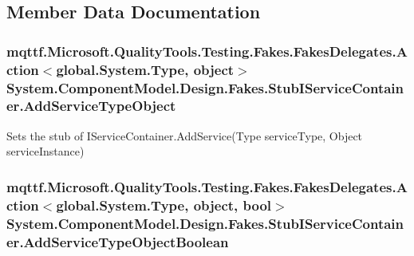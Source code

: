 \subsection{Member Data Documentation}
\hypertarget{class_system_1_1_component_model_1_1_design_1_1_fakes_1_1_stub_i_service_container_a14caf2877563b04dfa336bdf35048f4e}{
\subsubsection[{Add\-Service\-Type\-Object}]{\setlength{\rightskip}{0pt plus 5cm}mqttf.\-Microsoft.\-Quality\-Tools.\-Testing.\-Fakes.\-Fakes\-Delegates.\-Action$<$global.\-System.\-Type, object$>$ System.\-Component\-Model.\-Design.\-Fakes.\-Stub\-I\-Service\-Container.\-Add\-Service\-Type\-Object}}\label{class_system_1_1_component_model_1_1_design_1_1_fakes_1_1_stub_i_service_container_a14caf2877563b04dfa336bdf35048f4e}


Sets the stub of I\-Service\-Container.\-Add\-Service(\-Type service\-Type, Object service\-Instance)

\hypertarget{class_system_1_1_component_model_1_1_design_1_1_fakes_1_1_stub_i_service_container_ad234c01389ecd67f64ce97e854ad0123}{
\subsubsection[{Add\-Service\-Type\-Object\-Boolean}]{\setlength{\rightskip}{0pt plus 5cm}mqttf.\-Microsoft.\-Quality\-Tools.\-Testing.\-Fakes.\-Fakes\-Delegates.\-Action$<$global.\-System.\-Type, object, bool$>$ System.\-Component\-Model.\-Design.\-Fakes.\-Stub\-I\-Service\-Container.\-Add\-Service\-Type\-Object\-Boolean}}\label{class_system_1_1_component_model_1_1_design_1_1_fakes_1_1_stub_i_service_container_ad234c01389ecd67f64ce97e854ad0123}


